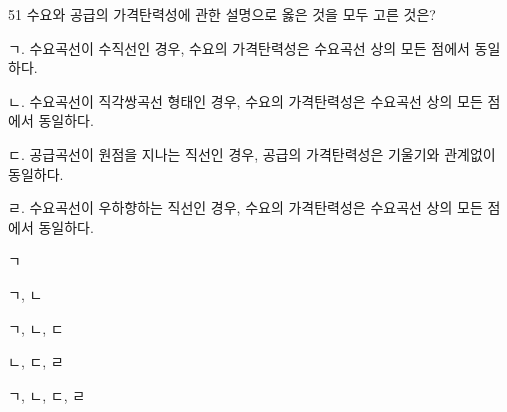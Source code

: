 \begin{question}{51}
수요와 공급의 가격탄력성에 관한 설명으로 옳은 것을 모두 고른 것은?
\begin{framedtext}
ㄱ. 수요곡선이 수직선인 경우, 수요의 가격탄력성은 수요곡선 상의 모든 점에서 동일하다. \par
ㄴ. 수요곡선이 직각쌍곡선 형태인 경우, 수요의 가격탄력성은 수요곡선 상의 모든 점에서 동일하다. \par
ㄷ. 공급곡선이 원점을 지나는 직선인 경우, 공급의 가격탄력성은 기울기와 관계없이 동일하다. \par
ㄹ. 수요곡선이 우하향하는 직선인 경우, 수요의 가격탄력성은 수요곡선 상의 모든 점에서 동일하다. \par
\end{framedtext}
\begin{choices}
  \item ㄱ
  \item ㄱ, ㄴ
  \item ㄱ, ㄴ, ㄷ
  \item ㄴ, ㄷ, ㄹ
  \item ㄱ, ㄴ, ㄷ, ㄹ
\end{choices}
\end{question}
